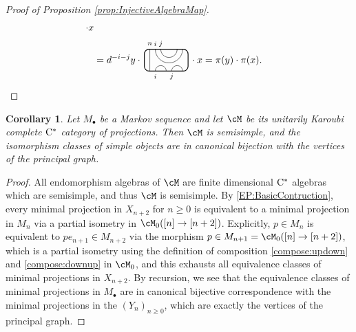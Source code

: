 \documentclass[11pt]{article}
\theoremstyle{plain}
\newtheorem{cor}[thm]{Corollary}
\theoremstyle{definition}
\newcommand{\Cstar}{\rm{C^*}}
\newcommand{\TLCapJoin}[5]{
 \TLTStart
 \TLTThrough{#1}
 \TLTCapJoin{#2}{#3}{#4}{#5}
 \TLTEnd
}
\newcommand{\TLTCalcLabelOffset}[3][0cm]{
 \settowidth{#2}{\scriptsize{$#3$}}
 \setlength{#2}{.5#2}
 \setlength{#2}{\maxof{#2}{#1}}
}
\newcommand{\TLTEnd}{
 \draw[thick, rounded corners = 5pt] (0,0) rectangle ($ (TLTlead) + (0,.8) $);
 \end{tikzpicture}
}
\newcommand{\TLTStart}{
 \begin{tikzpicture}[baseline=.3cm]
 \coordinate (TLTlead) at (.2,0); %
 \let\TLTlabelwidth\relax
 \newlength{\TLTlabelwidth}
}
\newcommand{\TLTThrough}[1]{
 \TLTCalcLabelOffset[.2cm]{\TLTlabelwidth}{#1}
 \coordinate (TLTlead) at ($ (TLTlead) + ({\TLTlabelwidth},0) $);
 \begin{scope}[shift=(TLTlead)]
  \draw (0,0) -- (0,.8);
  \node at (0,1) {\scriptsize{$#1$}};
 \end{scope}
  \coordinate (TLTlead) at ($ (TLTlead) + ({\TLTlabelwidth},0) $);
}
\newcommand{\TLTCapcup}[1]{
 \TLTCalcLabelOffset[.2cm]{\TLTlabelwidth}{#1}
  \coordinate (TLTlead) at ($ (TLTlead) + ({\TLTlabelwidth},0) $);
 \begin{scope}[shift=(TLTlead)]
  \draw (0,0) arc (180:0:.2);
  \draw (0,.8) arc (-180:0:.2);
  \node at (0,1) {\scriptsize{$#1$}};
 \end{scope}
 \TLTCalcLabelOffset[.5cm]{\TLTlabelwidth}{#1}
 \coordinate (TLTlead) at ($ (TLTlead) + ({\TLTlabelwidth},0)$);
}
\newcommand{\TLTCapJoin}[4]{
 \let\TLTjoinlwidth\relax
 \newlength{\TLTjoinlwidth}
 \let\TLTjoinrwidth\relax
 \newlength{\TLTjoinrwidth}
 \let\TLTsplitlwidth\relax
 \newlength{\TLTsplitlwidth}
 \let\TLTsplitrwidth\relax
 \newlength{\TLTsplitrwidth}
 \TLTCalcLabelOffset[.8cm]{\TLTjoinrwidth}{#4} %
 \TLTCalcLabelOffset[.15cm]{\TLTjoinlwidth}{#3} %
 \TLTCalcLabelOffset[.6cm]{\TLTsplitlwidth}{#1}
 \TLTCalcLabelOffset[.6cm]{\TLTsplitrwidth}{#2}
 \setlength{\TLTlabelwidth}{\maxof{\TLTjoinlwidth}{\TLTsplitlwidth}}
 \coordinate (TLTlead) at ($ (TLTlead) + ({\TLTlabelwidth},0) $);
 \setlength{\TLTlabelwidth}{\maxof{\TLTjoinrwidth}{\TLTsplitrwidth}} %
 \begin{scope}[shift=(TLTlead)]
  \draw (0,.8) arc (-180:0:.5);
  \draw (0.2,.8) arc (-180:0:.3);
  \draw (0,0) arc (180:0:.2);
  \draw ({\TLTsplitlwidth},0) arc (180:0:.2);
  \node at (0,1) {\scriptsize{$#4$}};
  \node at ({\TLTjoinlwidth},1) {\scriptsize{$#3$}};
  \node at (0,-.2) {\scriptsize{$#1$}};
  \node at ({\TLTsplitlwidth},-.2) {\scriptsize{$#2$}};
 \end{scope}
 \coordinate (TLTlead) at ($ (TLTlead) + ({\TLTlabelwidth},0) $);
}
\begin{document}
\begin{proof}[Proof of Proposition \ref{prop:InjectiveAlgebraMap}]
\begin{align*}
\cdot x %
\\&= 
d^{-i-j}
y\cdot\, 
 \begin{tikzpicture}[baseline=.3cm]
  \draw (.2,0) -- (.2,.8);
  \node at (.2,1) {\scriptsize{$n$}};
  \draw (.4,0) arc (180:0:.2cm);
  \node at (.4,-.2) {\scriptsize{$i$}};
  \draw (1,0) arc (180:0:.2cm);
  \node at (1,-.2) {\scriptsize{$j$}};
  \draw (.4,.8) arc (-180:0:.5cm);
  \node at (.4,1) {\scriptsize{$i$}};
  \draw (.6,.8) arc (-180:0:.3cm);
  \node at (.6,1) {\scriptsize{$j$}};
  \draw[thick, rounded corners = 5pt] (0,0) rectangle (1.6,.8);
 \end{tikzpicture}
\,\cdot x
=
\pi(y)\cdot \pi(x).
\qedhere
\end{align*}
\end{proof}

\begin{cor}
\label{cor:SemisimpleProjectionCategory}
Let $M_\bullet$ be a Markov sequence and let $\cM$ be its unitarily Karoubi complete $\Cstar$ category of projections.
Then $\cM$ is semisimple, and the isomorphism classes of simple objects are in canonical bijection with the vertices of the principal graph.
\end{cor}
\begin{proof}
All endomorphism algebras of $\cM$ are finite dimensional $\Cstar$ algebras which are semisimple, and thus $\cM$ is semisimple. By \ref{EP:BasicContruction}, every minimal projection in $X_{n+2}$ for $n\geq 0$ is equivalent to a minimal projection in $M_{n}$ via a partial isometry in $\cM_0([n] \to [n+2])$. 
Explicitly, $p\in M_n$ is equivalent to $p e_{n+1} \in M_{n+2}$ via the morphism $p\in M_{n+1} = \cM_0([n] \to [n+2])$, which is a partial isometry using the definition of composition \ref{compose:updown} and \ref{compose:downup} in $\cM_0$, and this exhausts all equivalence classes of minimal projections in $X_{n+2}$.
By recursion, we see that the equivalence classes of minimal projections in $M_\bullet$ are in canonical bijective correspondence with the minimal projections in the $(Y_n)_{n\geq 0}$, which are exactly the vertices of the principal graph.
\end{proof}
\end{document}
